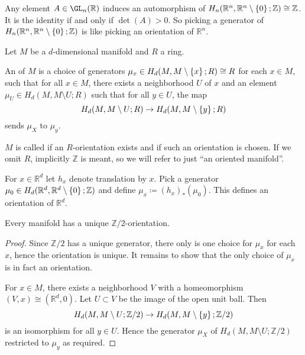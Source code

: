 Any element $A\in \GL_n(\mathbb{R})$ induces an automorphism of
$H_n(\mathbb{R}^n, \mathbb{R}^n \setminus \left\{  0  \right\}; \mathbb{Z}) \cong \mathbb{Z} $.
It is the identity if and only if $\det (A) > 0$.
So picking a generator of
$H_n(\mathbb{R}^n, \mathbb{R}^n \setminus \left\{  0  \right\}; \mathbb{Z})$
is like picking an orientation of $\mathbb{R}^n$.

\begin{definition}[Orientation]
  \label{def:orientation}
  Let $M$ be a  $d$-dimensional manifold and $R$ a ring.

  An  of $M$ is a choice of generators 
  $\mu_x \in H_d(M, M \setminus \left\{  x  \right\};R) \cong R $ 
  for each $x\in M$,
  such that for all $x\in M$,
  there exists a neighborhood $U$ of $x$
  and an element $\mu_U \in H_d(M, M \setminus U ; R)$ 
  such that for all $y\in U$, the map
  \[
    H_d(M, M \setminus U; R) \to H_d( M, M\setminus \left\{  y  \right\} ;R)
  \]
  sends $\mu_X$ to  $\mu_y$.

  $M$ is called  if an $R$-orientation exists
  and   if such an orientation is chosen.
  If we omit $R$, implicitly  $\mathbb{Z}$ is meant,
  so we will refer to just \enquote{an oriented manifold}.
\end{definition}

\begin{example}
  For $x\in \mathbb{R}^d$ let $h_x$ denote translation by $x$.
  Pick a generator
  $\mu_0 \in H_d(\mathbb{R}^d , \mathbb{R}^d \setminus \left\{  0  \right\};\mathbb{Z})$
  and define
  $\mu_x \coloneqq (h_x)_*(\mu_0)$.
  This defines an orientation of $\mathbb{R}^d$.
\end{example}

\begin{lemma}
  \label{lm:each-manifold-is-uniquely-orientable-in-z-2}
  Every manifold has a unique $\mathbb{Z}/2$-orientation.
\end{lemma}

\begin{proof}
  Since $\mathbb{Z}/2$ has a unique generator,
  there only is one choice for $\mu_x$ for each  $x$,
  hence the orientation is unique.
  It remains to show that the only choice of $\mu_x$ is in fact
  an orientation.

  For $x\in M$, there exists a neighborhood $V$ with a homeomorphism
  $(V,x) \cong (\mathbb{R}^d, 0)$.
  Let $U\subset V$ be the image of the open unit ball.
  Then
  \[
    H_d(M, M\setminus U;\mathbb{Z}/2)
    \to
    H_d(M, M\setminus \left\{  y  \right\}; \mathbb{Z}/2 )
  \]
  is an isomorphism for all $y \in U$.
  Hence the generator $\mu_X$ of $H_d(M, M \setminus U ; \mathbb{Z}/2)$
  restricted to $\mu_y$ as required.
\end{proof}

